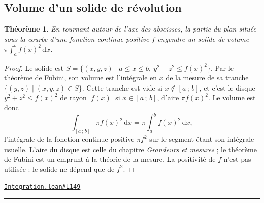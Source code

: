 \documentclass[11pt,a4paper]{article}
\theoremstyle{definition}
\theoremstyle{plain}
\newtheorem{theoreme}{Théorème}
\newcommand{\source}[2]{\par\smallskip\noindent\hfill{\footnotesize\href{#1}{\texttt{#2}}}\par\smallskip}
\begin{document}
\subsection{Volume d'un solide de révolution}

\begin{theoreme}
En tournant autour de l'axe des abscisses, la partie du plan située sous la courbe d'une
fonction continue positive $f$ engendre un solide de volume
$\pi \int_a^b f(x)^2 \, \mathrm{d}x$.
\end{theoreme}
\begin{proof}
Le solide est $S = \{(x, y, z) \mid a \le x \le b,\ y^2 + z^2 \le f(x)^2\}$. Par le théorème de
Fubini, son volume est l'intégrale en $x$ de la mesure de sa tranche
$\{(y, z) \mid (x, y, z) \in S\}$. Cette tranche est vide si $x \notin [a\,;\,b]$, et c'est
le disque $y^2 + z^2 \le f(x)^2$ de rayon $|f(x)|$ si $x \in [a\,;\,b]$, d'aire $\pi f(x)^2$.
Le volume est donc
\[ \int_{[a\,;\,b]} \pi f(x)^2 \,\mathrm{d}x = \pi \int_a^b f(x)^2 \,\mathrm{d}x , \]
l'intégrale de la fonction continue positive $\pi f^2$ sur le segment étant son intégrale
usuelle. L'aire du disque est celle du chapitre \emph{Grandeurs et mesures} ; le théorème de
Fubini est un emprunt à la théorie de la mesure. La positivité de $f$ n'est pas utilisée :
le solide ne dépend que de $f^2$.
\end{proof}
\source{https://github.com/Commutator-IO/learn-lean/blob/main/courses/02-lycee/06-integration/Integration.lean\#L149}{Integration.lean\#L149}

\vfill
\noindent\rule{0.35\linewidth}{0.4pt}\par
{}
\end{document}
